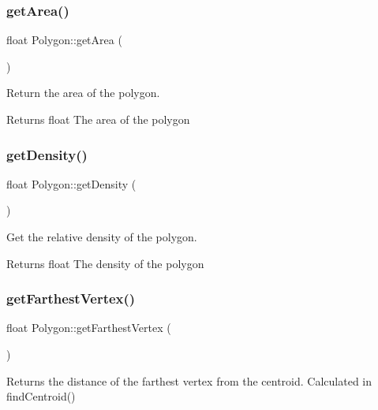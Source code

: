 \subsubsection{\texorpdfstring{getArea()}{getArea()}\hspace{0.1cm}{\footnotesize\ttfamily [2/2]}}
{\footnotesize\ttfamily float Polygon\+::get\+Area (\begin{DoxyParamCaption}{ }\end{DoxyParamCaption})}



Return the area of the polygon. 

\begin{DoxyReturn}{Returns}
float The area of the polygon 
\end{DoxyReturn}
\mbox{\label{class_polygon_a93f38d702fe7c95af0ac72910c00908e}} 
\subsubsection{\texorpdfstring{getDensity()}{getDensity()}}
{\footnotesize\ttfamily float Polygon\+::get\+Density (\begin{DoxyParamCaption}{ }\end{DoxyParamCaption})}



Get the relative density of the polygon. 

\begin{DoxyReturn}{Returns}
float The density of the polygon 
\end{DoxyReturn}
\mbox{\label{class_polygon_aa4da77df0658cdcc0797443844c69a3f}} 
\subsubsection{\texorpdfstring{getFarthestVertex()}{getFarthestVertex()}}
{\footnotesize\ttfamily float Polygon\+::get\+Farthest\+Vertex (\begin{DoxyParamCaption}{ }\end{DoxyParamCaption})}



Returns the distance of the farthest vertex from the centroid. Calculated in find\+Centroid() 


